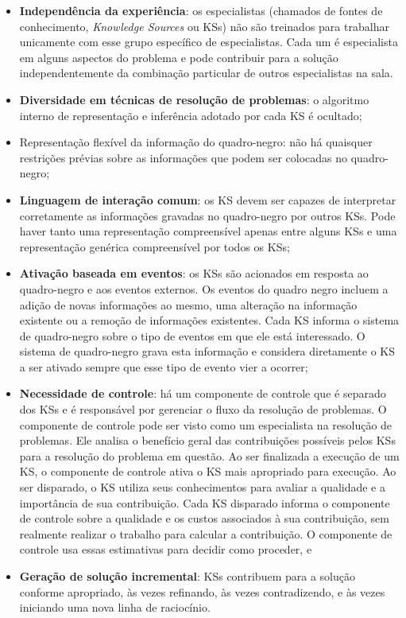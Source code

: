 \begin{description}
\begin{itemize}
    \item \textbf{Independência da experiência}: os especialistas (chamados de fontes de conhecimento, \textit{Knowledge Sources} ou KSs) não são treinados para trabalhar unicamente com esse grupo específico de especialistas. Cada um é especialista em alguns aspectos do problema e pode contribuir para a solução independentemente da combinação particular de outros especialistas na sala.
    \item \textbf{Diversidade em técnicas de resolução de problemas}: o algoritmo interno de representação e inferência adotado por cada KS é ocultado;
    \item Representação flexível da informação do quadro-negro: não há quaisquer restrições prévias sobre as informações que podem ser colocadas no quadro-negro;
    \item \textbf{Linguagem de interação comum}: os KS devem ser capazes de interpretar corretamente as informações gravadas no quadro-negro por outros KSs. Pode haver tanto uma representação compreensível apenas entre alguns KSs e uma representação genérica compreensível por todos os KSs;
    \item \textbf{Ativação baseada em eventos}: os KSs são acionados em resposta ao quadro-negro e aos eventos externos. Os eventos do quadro negro incluem a adição de novas informações ao mesmo, uma alteração na informação existente ou a remoção de informações existentes. Cada KS informa o sistema de quadro-negro sobre o tipo de eventos em que ele está interessado. O sistema de quadro-negro grava esta informação e considera diretamente o KS a ser ativado sempre que esse tipo de evento vier a ocorrer;
    \item \textbf{Necessidade de controle}: há um componente de controle que é separado dos KSs e é responsável por gerenciar o fluxo  da resolução de problemas. O componente de controle pode ser visto como um especialista na resolução de problemas. Ele analisa o benefício geral das contribuições possíveis pelos KSs para a resolução do problema em questão. Ao ser finalizada a execução de um KS, o componente de controle ativa o KS mais apropriado para execução. Ao ser disparado, o KS utiliza seus conhecimentos para avaliar a qualidade e a importância de sua contribuição. Cada KS disparado informa o componente de controle sobre a qualidade e os custos associados à sua contribuição, sem realmente realizar o trabalho para calcular a contribuição. O componente de controle usa essas estimativas para decidir como proceder, e
    \item \textbf{Geração de solução incremental}: KSs contribuem para a solução conforme apropriado, às vezes refinando, às vezes contradizendo, e às vezes iniciando uma nova linha de raciocínio.
\end{itemize}


\end{description}
